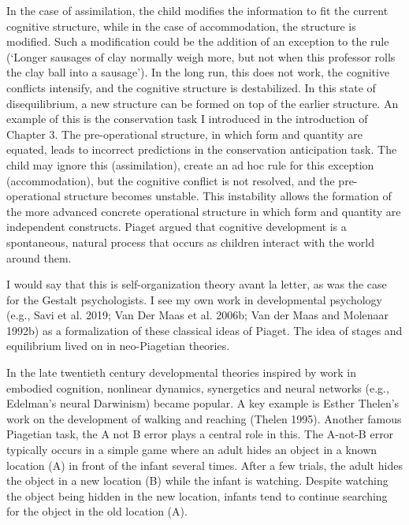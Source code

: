 \documentclass[
  a4paper,
  DIV=11,
  numbers=noendperiod]{scrreprt}
\begin{document}
In the case of assimilation, the child modifies the information to fit
the current cognitive structure, while in the case of accommodation, the
structure is modified. Such a modification could be the addition of an
exception to the rule (`Longer sausages of clay normally weigh more, but
not when this professor rolls the clay ball into a sausage'). In the
long run, this does not work, the cognitive conflicts intensify, and the
cognitive structure is destabilized. In this state of disequilibrium, a
new structure can be formed on top of the earlier structure. An example
of this is the conservation task I introduced in the introduction of
Chapter 3. The pre-operational structure, in which form and quantity are
equated, leads to incorrect predictions in the conservation anticipation
task. The child may ignore this (assimilation), create an ad hoc rule
for this exception (accommodation), but the cognitive conflict is not
resolved, and the pre-operational structure becomes unstable. This
instability allows the formation of the more advanced concrete
operational structure in which form and quantity are independent
constructs. Piaget argued that cognitive development is a spontaneous,
natural process that occurs as children interact with the world around
them.

I would say that this is self-organization theory avant la letter, as
was the case for the Gestalt psychologists. I see my own work in
developmental psychology (e.g., Savi et al. 2019; Van Der Maas et al.
2006b; Van der Maas and Molenaar 1992b) as a formalization of these
classical ideas of Piaget. The idea of stages and equilibrium lived on
in neo-Piagetian theories.

In the late twentieth century developmental theories inspired by work in
embodied cognition, nonlinear dynamics, synergetics and neural networks
(e.g., Edelman's neural Darwinism) became popular. A key example is
Esther Thelen's work on the development of walking and reaching (Thelen
1995). Another famous Piagetian task, the A not B error plays a central
role in this. The A-not-B error typically occurs in a simple game where
an adult hides an object in a known location (A) in front of the infant
several times. After a few trials, the adult hides the object in a new
location (B) while the infant is watching. Despite watching the object
being hidden in the new location, infants tend to continue searching for
the object in the old location (A).
\end{document}
